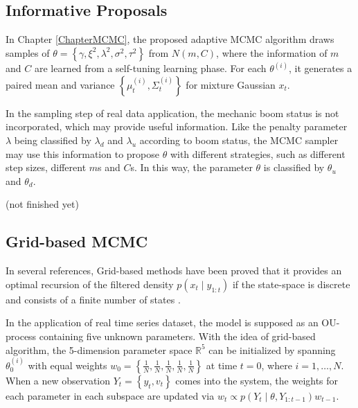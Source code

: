 \subsection*{Informative Proposals}

In Chapter \ref{ChapterMCMC}, the proposed adaptive MCMC algorithm draws samples of $\theta=\left\lbrace\gamma,\xi^2,\lambda^2,\sigma^2,\tau^2\right\rbrace$ from $N(m,C)$, where the information of $m$ and $C$ are learned from a self-tuning learning phase. For each $\theta^{(i)}$, it generates a paired mean and variance $\left\lbrace\mu_t^{(i)},\Sigma_t^{(i)}\right\rbrace$ for mixture Gaussian $x_t$. 

In the sampling step of real data application, the mechanic boom status is not incorporated, which may provide useful information. Like the penalty parameter $\lambda$ being classified by $\lambda_d$ and $\lambda_u$ according to boom status, the MCMC sampler may use this information to propose $\theta$ with different strategies, such as different step sizes, different $m$s and $C$s. In this way, the parameter $\theta$ is classified by $\theta_u$ and $\theta_d$. 

(not finished yet)



\subsection*{Grid-based MCMC}

In several references, Grid-based methods have been proved that it provides an optimal recursion of the filtered density $p(x_t\mid y_{1:t})$ if the state-space is discrete and consists of a finite number of states \citep{ristic2004beyond, stroud2016bayesian, arulampalam2002tutorial, hartmann2016grid}. 

In the application of real time series dataset, the model is supposed as an OU-process containing five unknown parameters. With the idea of grid-based algorithm, the 5-dimension parameter space $\mathbb{R}^5$ can be initialized by spanning $\theta_0^{(i)}$ with equal weights $w_0=\left\lbrace\frac{1}{N},\frac{1}{N},\frac{1}{N},\frac{1}{N},\frac{1}{N}\right\rbrace$ at time $t=0$, where $i=1,\ldots,N$. When a new observation $Y_t=\left\lbrace y_t,v_t\right\rbrace$ comes into the system, the weights for each parameter in each subspace are updated via $w_t\propto p(Y_t\mid \theta,Y_{1:t-1})w_{t-1}$. 

